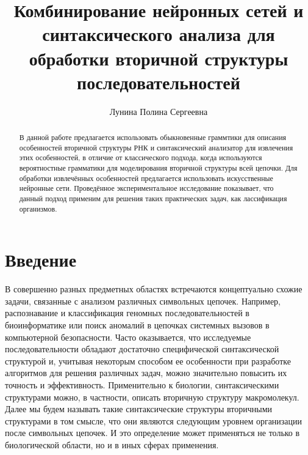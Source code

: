 \title{Комбинирование нейронных сетей и синтаксического анализа для обработки вторичной структуры последовательностей}


\author{Лунина Полина Сергеевна}



\maketitle

\begin{abstract}
В данной работе предлагается использовать обыкновенные граммтики для описания особенностей вторичной структуры РНК и синтаксический анализатор для извлечения этих особенностей, в отличие от классического подхода, когда используются вероятностные грамматики для моделирования вторичной структуры всей цепочки. Для обработки извлечённых особенностей предлагается использовать искусственные нейронные сети. Проведённое экспериментальное исследование показывает, что данный подход применим для решения таких практических задач, как лассификация организмов.
\end{abstract}

\section*{Введение}
В совершенно разных предметных областях встречаются концептуально схожие задачи, связанные с анализом различных символьных цепочек. Например, распознавание и классификация геномных последовательностей в биоинформатике или поиск аномалий в цепочках системных вызовов в компьютерной безопасности. Часто оказывается, что исследуемые последовательности обладают достаточно специфической синтаксической структурой и, учитывая некоторым способом ее особенности при разработке алгоритмов для решения различных задач, можно значительно повысить их точность и эффективность. Применительно к биологии, синтаксическими структурами можно, в частности, описать вторичную структуру макромолекул. Далее мы будем называть такие синтаксические структуры вторичными структурами в том смысле, что они являются следующим уровнем организации после символьных цепочек. И это определение может применяться не только в биологической области, но и в иных сферах применения.

